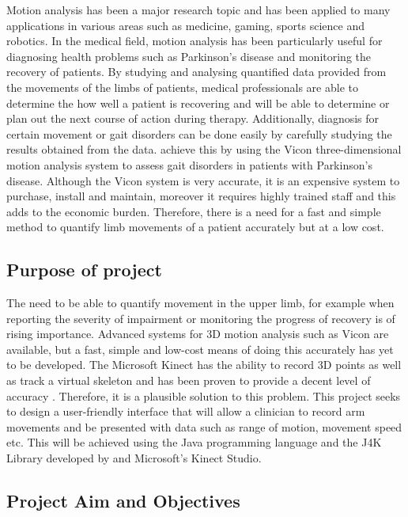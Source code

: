 \documentclass[a4paper, 12pt]{article}
\begin{document}
Motion analysis has been a major research topic and has been applied to many applications in various areas such as medicine, gaming, sports science and robotics.  In the medical field, motion analysis has been particularly useful for diagnosing health problems such as Parkinson’s disease \citep{Galnaetal2014} and monitoring the recovery of patients. By studying and analysing quantified data provided from the movements of the limbs of patients, medical professionals are able to determine the how well a patient is recovering and will be able to determine or plan out the next course of action during therapy. Additionally, diagnosis for certain movement or gait disorders can be done easily by carefully studying the results obtained from the data. \citet{Mireketal2007} achieve this by using the Vicon three-dimensional motion analysis system to assess gait disorders in patients with Parkinson’s disease. Although the Vicon system is very accurate, it is an expensive system to purchase, install and maintain, moreover it requires highly trained staff and this adds to the economic burden. Therefore, there is a need for a fast and simple method to quantify limb movements of a patient accurately but at a low cost. 

\subsection{Purpose of project}

The need to be able to quantify movement in the upper limb, for example when reporting the severity of impairment or monitoring the progress of recovery is of rising importance. Advanced systems for 3D motion analysis such as Vicon are available, but a fast, simple and low-cost means of doing this accurately has yet to be developed. The Microsoft Kinect has the ability to record 3D points as well as track a virtual skeleton and has been proven to provide a decent level of accuracy \citep{Clarketal2012}\citep{Galnaetal2014}. Therefore, it is a plausible solution to this problem. This project seeks to design a user-friendly interface that will allow a clinician to record arm movements and be presented with data such as range of motion, movement speed etc. This will be achieved using the Java programming language and the J4K Library developed by \citet{barmpoutis2013} and Microsoft's Kinect Studio.

\subsection{Project Aim and Objectives}
\end{document}
